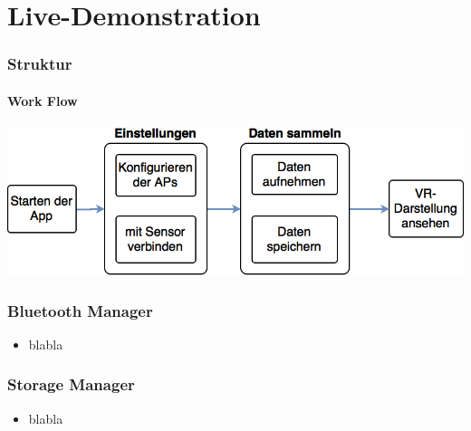 \documentclass{beamer}
\begin{document}
\section{Live-Demonstration}

\begin{frame}
\frametitle{Struktur}
\framesubtitle{Work Flow}
	\includegraphics[width=\textwidth]{diagram/workflow.png}
\end{frame}


\begin{frame}
\frametitle{Bluetooth Manager}
\begin{itemize}
  \item blabla
\end{itemize}
\end{frame}

\begin{frame}
\frametitle{Storage Manager}
\begin{itemize}
  \item blabla
\end{itemize}
\end{frame}
\end{document}
